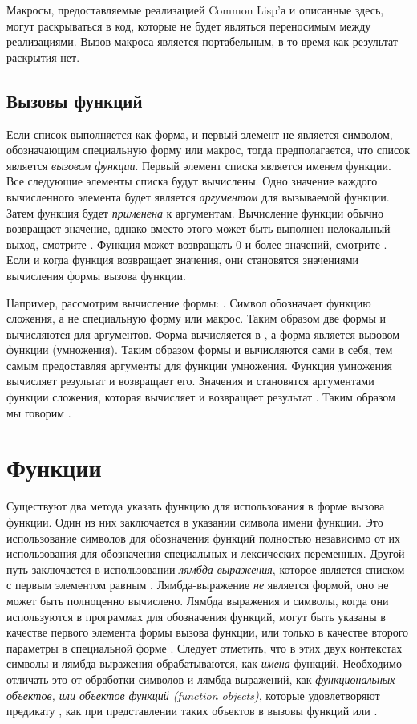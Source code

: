 Макросы, предоставляемые реализацией Common Lisp'а и описанные здесь, могут
раскрываться в код, которые не будет являться переносимым между реализациями.
Вызов макроса является портабельным, в то время как результат раскрытия нет.

\subsection{Вызовы функций}

Если список выполняется как форма, и первый элемент не является символом,
обозначающим специальную форму или макрос, тогда предполагается, что список
является \emph{вызовом функции}. Первый элемент списка является именем
функции. Все следующие элементы списка будут вычислены. Одно значение каждого
вычисленного элемента будет является \emph{аргументом} для вызываемой
функции. 
Затем функция будет \emph{применена} к аргументам. Вычисление функции обычно
возвращает значение, однако вместо этого может быть выполнен нелокальный выход,
смотрите . Функция может возвращать 0 и более значений, смотрите
. 
Если и когда функция возвращает значения, они становятся значениями вычисления
формы вызова функции.

Например, рассмотрим вычисление формы: .
Символ \cdf{+} обозначает функцию сложения, а не специальную форму или макрос.
Таким образом две формы  и  вычисляются для аргументов. Форма
 вычисляется в , а форма  является вызовом функции
(умножения). Таким образом формы  и  вычисляются сами в себя, тем
самым предоставляя аргументы для функции умножения. Функция умножения вычисляет
результат  и возвращает его. Значения  и  становятся
аргументами функции сложения, которая вычисляет и возвращает результат
. Таким образом мы говорим .

\section{Функции}

Существуют два метода указать функцию для использования в форме вызова
функции. Один из них заключается в указании символа имени функции. Это
использование символов для обозначения функций полностью независимо от их
использования для обозначения специальных и лексических переменных. Другой путь
заключается в использовании \emph{лямбда-выражения}, которое является списком
с первым элементом равным . Лямбда-выражение \emph{не} является
формой, оно не может быть полноценно вычислено. Лямбда выражения и символы,
когда они используются в программах для обозначения функций, могут быть
указаны в качестве первого элемента формы вызова функции, или только в качестве
второго параметры в специальной форме . Следует отметить, что
в этих двух контекстах символы и лямбда-выражения обрабатываются, как
\emph{имена} функций. Необходимо отличать это от обработки символов и лямбда
выражений, как \emph{функциональных объектов, или объектов функций (function
  objects)}, которые удовлетворяют предикату , как при
представлении таких объектов в вызовы функций  или .

